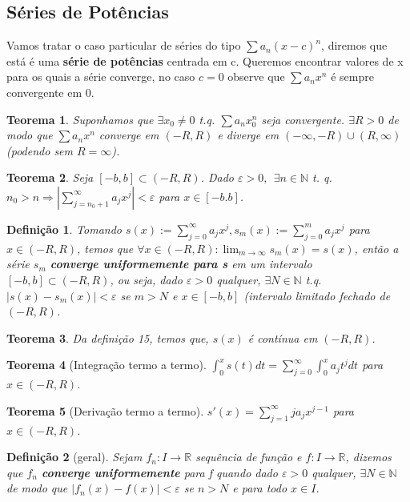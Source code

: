 \documentclass[12pt]{article}
\newtheorem{theorem}{Teorema}[section]
\newtheorem{definition}{Definição}
\begin{document}
\subsection{Séries de Potências}
Vamos tratar o caso particular de séries do tipo $\sum a_n (x-c)^n$, diremos que está é uma \textbf{série de potências} centrada em c. Queremos encontrar valores de x para os quais a série converge, no caso $c = 0$ observe que $\sum a_n x^n$ é sempre convergente em 0.

\begin{theorem}
    Suponhamos que $\exists x_0 \neq 0$ t.q. $\sum a_n x_0^n$ seja convergente. $\exists R > 0$ de modo que $\sum a_n x^n$ converge em $(-R, R)$ e diverge em $(- \infty, -R) \cup (R, \infty)$ (podendo sem $R = \infty$). 
\end{theorem}

\begin{theorem}
    Seja $[-b, b] \subset (-R, R)$. Dado $\varepsilon > 0, \ \ \exists n \in \mathbb{N}$ t. q. $n_0 > n \Rightarrow |\sum_{j = n_0 + 1}^\infty a_j x^j| < \varepsilon$ para $x \in [-b. b]$.
\end{theorem}

\begin{definition}
    Tomando $s(x):= \sum_{j=0}^\infty a_j x^j, s_m(x):= \sum_{j=0}^m a_j x^j$ para $x \in (-R, R)$, temos que $\forall x \in (-R, R): \lim_{m \rightarrow{} \infty} s_m(x) = s(x)$, então a série $s_m$ \textbf{converge uniformemente para s} em um intervalo $[-b, b] \subset (-R, R)$, ou seja, dado $\varepsilon > 0$ qualquer, $\exists N \in \mathbb{N}$ t.q. $|s(x) - s_m(x)| < \varepsilon$ se $m > N$ e $x \in [-b, b]$ (intervalo limitado fechado de $(-R, R)$.
\end{definition}

\begin{theorem}
    Da definição 15, temos que, $s(x)$ é contínua em $(-R, R)$.
\end{theorem}

\begin{theorem}[Integração termo a termo]
    $\int_0^x s(t) d t = \sum_{j=0}^\infty \int_0^x a_j t^j d t$ para $x \in (-R, R)$.
\end{theorem}

\begin{theorem}[Derivação termo a termo]
    $s'(x) = \sum_{j=1}^\infty j a_j x^{j-1}$ para $x \in (-R, R)$.
\end{theorem}

\begin{definition}[geral]
    Sejam $f_n: I \rightarrow{} \mathbb{R}$ sequência de função e $f: I \rightarrow{} \mathbb{R}$, dizemos que $f_n$ \textbf{converge uniformemente} para f quando dado $\varepsilon > 0$ qualquer, $\exists N \in \mathbb{N}$ de modo que $|f_n(x) - f(x)| < \varepsilon$ se $n > N$ e para todo $x \in I$.
\end{definition}
\end{document}
